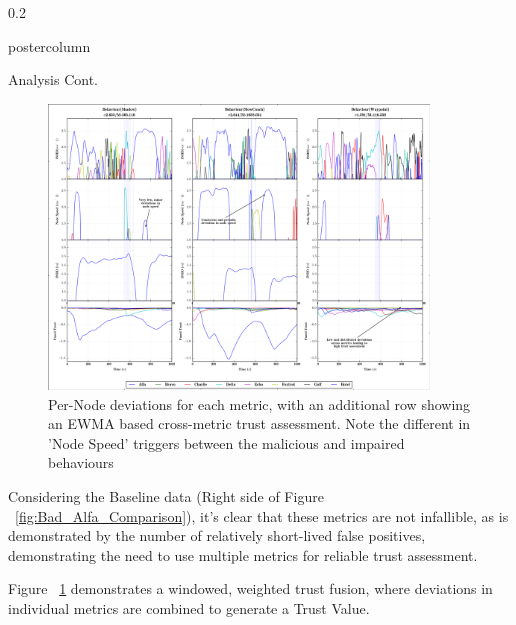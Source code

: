 \documentclass[final,hyperref={pdfpagelabels=false}]{beamer}
\def\colwidth{0.2\linewidth}
\begin{document}
\begin{frame}[fragile]
\begin{columns}[T]
\begin{column}{\colwidth}
\begin{beamercolorbox}[center,wd=\textwidth]{postercolumn}
\begin{minipage}[T]{.98\textwidth}
{\begin{block}{Analysis Cont.}
            \begin{figure}
              \includegraphics[width=0.9\textwidth]{figures/Bad_Alfa_Fusion}
              \caption{Per-Node deviations for each metric, with an additional row showing an EWMA based cross-metric trust assessment. Note the different in 'Node Speed' triggers between the malicious and impaired behaviours }
              \label{fig:Bad_Alfa_Fusion}
            \end{figure}


            Considering the Baseline data (Right side of Figure ~\ref{fig:Bad_Alfa_Comparison}), it's clear that these metrics are not infallible, as is demonstrated by the number of relatively short-lived false positives, demonstrating the need to use multiple metrics for reliable trust assessment.

            \vspace{0.3\baselineskip}

            Figure ~\ref{fig:Bad_Alfa_Fusion} demonstrates a windowed, weighted trust fusion, where deviations in individual metrics are combined to generate a Trust Value. 
          \end{block}

}
\end{minipage}
\end{beamercolorbox}
\end{column}
\end{columns}
\end{frame}
\end{document}
